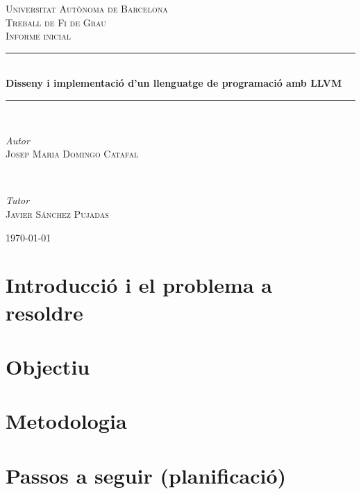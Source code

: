 \documentclass{article}
\begin{document}
\begin{titlepage}
	\newcommand{\HRule}{\rule{\linewidth}{0.4mm}} %
	
	\center

    \vspace*{25px}
	
	\textsc{\LARGE Universitat Autònoma de Barcelona}\\[1.5cm]
	
	\textsc{\Large Treball de Fi de Grau}\\[0.5cm]
	
	\textsc{\Large Informe inicial}\\[0.5cm]
	
	\HRule\\[0.4cm]
	
	{\LARGE\bfseries Disseny i implementació d'un llenguatge de programació amb LLVM}\\[0.4cm]
	
	\HRule\\[1.5cm]
	
	
	\begin{minipage}{0.5\textwidth}
		\begin{flushleft}
			\large
			\textit{Autor}\\
			\textsc{Josep Maria Domingo Catafal}
		\end{flushleft}
	\end{minipage}
	~
	\begin{minipage}{0.4\textwidth}
		\begin{flushright}
			\large
			\textit{Tutor}\\
			\textsc{Javier Sánchez Pujadas}
		\end{flushright}
	\end{minipage}
	

	\vfill\vfill\vfill %
	
	{\large\today} %

	\vfill %
\end{titlepage}

\section{Introducció i el problema a resoldre}
\lipsum[1]
\section{Objectiu}
\lipsum[1]
\section{Metodologia}
\lipsum[1]
\section{Passos a seguir (planificació)}
\lipsum[1]
\end{document}
